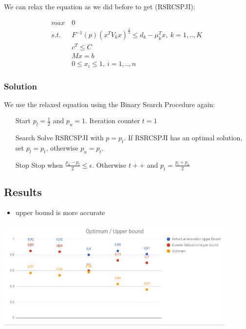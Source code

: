 \documentclass{beamer}
\begin{document}
\begin{frame}

We can relax the equation as we did before to get (RSRCSPJI):

\begin{align*}
 max\ & 0\\
 s.t.\ & F^{-1}(p)(x^TV_kx)^{\frac{1}{2}} \leq d_k - \mu_k^Tx,\ k=1,..,K \\
 & c^T \leq C \\
 & Mx = b \\
 & 0 \leq x_i \leq 1,\ i=1,..,n
\end{align*}
\end{frame}

\subsubsection{Solution}

\begin{frame}

We use the relaxed equation using the Binary Search Procedure again:

\begin{itemize}
\item[Start] $p_l = \frac{1}{2}$ and $p_u = 1$. Iteration counter $t = 1$
\item[Search] Solve RSRCSPJI with $p = p_t$. If RSRCSPJI has an optimal solution, set $p_l = p_t$, otherwise $p_u = p_t$.
\item[Stop] Stop when $\frac{p_u - p_l}{2} \leq \epsilon$. Otherwise $t++$ and $p_t = \frac{p_l + p_u}{2} $
\end{itemize}
\end{frame}

\subsection{Results}

\begin{frame}
\begin{itemize}
	\item upper bound is more accurate
\end{itemize}
\hspace*{-0.8cm}
\includegraphics[width=12cm]{media/optimum_upperbound.png}
\end{frame}
\end{document}
